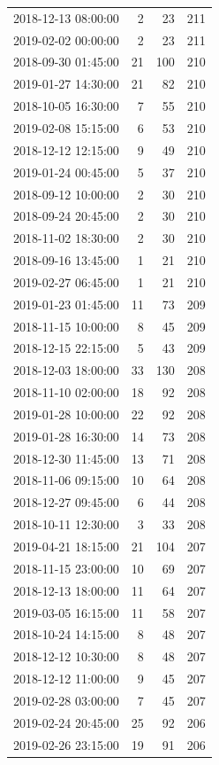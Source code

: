 \begin{tabular}{lrrr}
2018-12-13 08:00:00 & 2 & 23 & 211 \\
2019-02-02 00:00:00 & 2 & 23 & 211 \\
2018-09-30 01:45:00 & 21 & 100 & 210 \\
2019-01-27 14:30:00 & 21 & 82 & 210 \\
2018-10-05 16:30:00 & 7 & 55 & 210 \\
2019-02-08 15:15:00 & 6 & 53 & 210 \\
2018-12-12 12:15:00 & 9 & 49 & 210 \\
2019-01-24 00:45:00 & 5 & 37 & 210 \\
2018-09-12 10:00:00 & 2 & 30 & 210 \\
2018-09-24 20:45:00 & 2 & 30 & 210 \\
2018-11-02 18:30:00 & 2 & 30 & 210 \\
2018-09-16 13:45:00 & 1 & 21 & 210 \\
2019-02-27 06:45:00 & 1 & 21 & 210 \\
2019-01-23 01:45:00 & 11 & 73 & 209 \\
2018-11-15 10:00:00 & 8 & 45 & 209 \\
2018-12-15 22:15:00 & 5 & 43 & 209 \\
2018-12-03 18:00:00 & 33 & 130 & 208 \\
2018-11-10 02:00:00 & 18 & 92 & 208 \\
2019-01-28 10:00:00 & 22 & 92 & 208 \\
2019-01-28 16:30:00 & 14 & 73 & 208 \\
2018-12-30 11:45:00 & 13 & 71 & 208 \\
2018-11-06 09:15:00 & 10 & 64 & 208 \\
2018-12-27 09:45:00 & 6 & 44 & 208 \\
2018-10-11 12:30:00 & 3 & 33 & 208 \\
2019-04-21 18:15:00 & 21 & 104 & 207 \\
2018-11-15 23:00:00 & 10 & 69 & 207 \\
2018-12-13 18:00:00 & 11 & 64 & 207 \\
2019-03-05 16:15:00 & 11 & 58 & 207 \\
2018-10-24 14:15:00 & 8 & 48 & 207 \\
2018-12-12 10:30:00 & 8 & 48 & 207 \\
2018-12-12 11:00:00 & 9 & 45 & 207 \\
2019-02-28 03:00:00 & 7 & 45 & 207 \\
2019-02-24 20:45:00 & 25 & 92 & 206 \\
2019-02-26 23:15:00 & 19 & 91 & 206 \\

\end{tabular}
